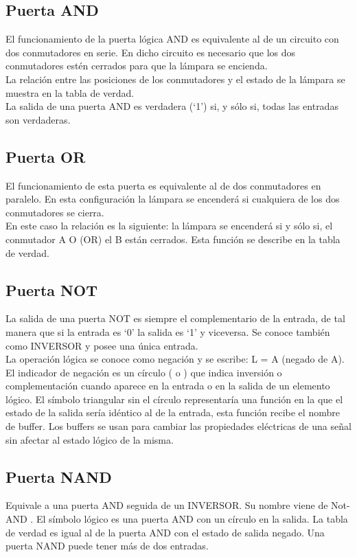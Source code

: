 \documentclass{article}
\begin{document}
        \subsection{\textbf{Puerta AND}}
            El funcionamiento de la puerta lógica AND es equivalente al de un circuito con dos conmutadores en serie. En dicho circuito es necesario que los dos conmutadores estén cerrados para que la lámpara se encienda.\\
            La relación entre las posiciones de los conmutadores y el estado de la lámpara se muestra en la tabla de verdad.\\
            La salida de una puerta AND es verdadera (‘1’) si, y sólo si, todas las entradas son verdaderas.
        \subsection{\textbf{Puerta OR}}
            El funcionamiento de esta puerta es equivalente al de dos conmutadores en paralelo. En esta configuración la lámpara se encenderá si cualquiera de los dos conmutadores se cierra.\\
            En este caso la relación es la siguiente: la lámpara se encenderá si y sólo si, el conmutador A O (OR) el B están cerrados. Esta función se describe en la tabla de verdad.\\
        \subsection{\textbf{Puerta NOT}}
            La salida de una puerta NOT es siempre el complementario de la entrada, de tal manera que si la entrada es ‘0’ la salida es ‘1’ y viceversa. Se conoce también como INVERSOR y posee una única entrada. \\
            La operación lógica se conoce como negación y se escribe: L = A (negado de A).\\
            El indicador de negación es un círculo ( o ) que indica inversión o complementación cuando aparece en la entrada o en la salida de un elemento lógico. El símbolo triangular sin el círculo representaría una función en la que el estado de la salida sería idéntico al de la entrada, esta función recibe el nombre de buffer. Los buffers se usan para cambiar las propiedades eléctricas de una señal sin afectar al estado lógico de la misma.\\
        \subsection{\textbf{Puerta NAND}}
            Equivale a una puerta AND seguida de un INVERSOR. Su nombre viene de Not-AND . El símbolo lógico es una puerta AND con un círculo en la salida. La tabla de verdad es igual al de la puerta AND con el estado de salida negado. Una puerta NAND puede tener más de dos entradas.\\
        
\end{document}
